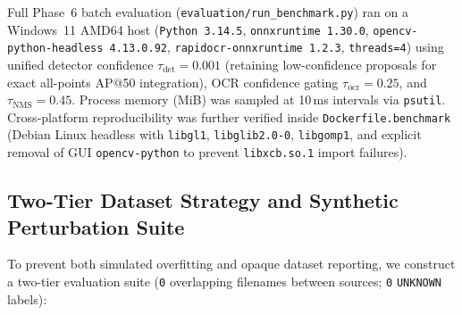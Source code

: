 \documentclass[pdflatex,sn-mathphys-num]{sn-jnl}
\begin{document}
Full Phase~6 batch evaluation (\texttt{evaluation/run\_benchmark.py}) ran on a Windows~11 AMD64 host (\texttt{Python 3.14.5}, \texttt{onnxruntime 1.30.0}, \texttt{opencv-python-headless 4.13.0.92}, \texttt{rapidocr-onnxruntime 1.2.3}, \texttt{threads=4}) using unified detector confidence $\tau_{\text{det}}=0.001$ (retaining low-confidence proposals for exact all-points AP@50 integration), OCR confidence gating $\tau_{\text{ocr}}=0.25$, and $\tau_{\text{NMS}}=0.45$. Process memory (MiB) was sampled at 10\,ms intervals via \texttt{psutil}. Cross-platform reproducibility was further verified inside \texttt{Dockerfile.benchmark} (Debian Linux headless with \texttt{libgl1}, \texttt{libglib2.0-0}, \texttt{libgomp1}, and explicit removal of GUI \texttt{opencv-python} to prevent \texttt{libxcb.so.1} import failures).

\subsection{Two-Tier Dataset Strategy and Synthetic Perturbation Suite}\label{subsec:datasets}
To prevent both simulated overfitting and opaque dataset reporting, we construct a two-tier evaluation suite (\texttt{0} overlapping filenames between sources; \texttt{0} \texttt{UNKNOWN} labels):
\end{document}
